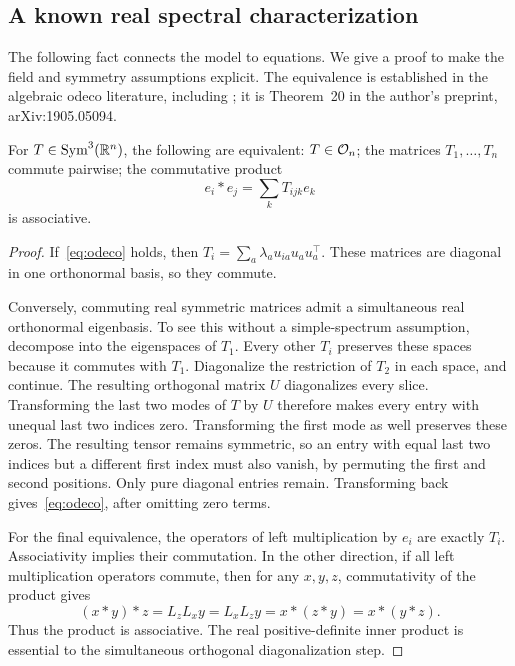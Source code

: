 \subsection{A known real spectral characterization}
The following fact connects the model to equations. We give a proof to make the field and symmetry assumptions explicit. The equivalence is established in the algebraic odeco literature, including \citet{koiran2021}; it is Theorem~20 in the author's preprint, arXiv:1905.05094.

\begin{lemma}\label{lem:commuting}
For $T\in\operatorname{Sym}^3(\mathbb R^n)$, the following are equivalent: $T\in\mathcal O_n$; the matrices $T_1,\ldots,T_n$ commute pairwise; the commutative product
\begin{equation}\label{eq:product}
 e_i*e_j=\sum_k T_{ijk}e_k
\end{equation}
is associative.
\end{lemma}
\begin{proof}
If~\eqref{eq:odeco} holds, then $T_i=\sum_a\lambda_a u_{ia}u_au_a^\top$. These matrices are diagonal in one orthonormal basis, so they commute.

Conversely, commuting real symmetric matrices admit a simultaneous real orthonormal eigenbasis. To see this without a simple-spectrum assumption, decompose into the eigenspaces of $T_1$. Every other $T_i$ preserves these spaces because it commutes with $T_1$. Diagonalize the restriction of $T_2$ in each space, and continue. The resulting orthogonal matrix $U$ diagonalizes every slice. Transforming the last two modes of $T$ by $U$ therefore makes every entry with unequal last two indices zero. Transforming the first mode as well preserves these zeros. The resulting tensor remains symmetric, so an entry with equal last two indices but a different first index must also vanish, by permuting the first and second positions. Only pure diagonal entries remain. Transforming back gives~\eqref{eq:odeco}, after omitting zero terms.

For the final equivalence, the operators of left multiplication by $e_i$ are exactly $T_i$. Associativity implies their commutation. In the other direction, if all left multiplication operators commute, then for any $x,y,z$, commutativity of the product gives
\[
 (x*y)*z=L_zL_xy=L_xL_zy=x*(z*y)=x*(y*z).
\]
Thus the product is associative. The real positive-definite inner product is essential to the simultaneous orthogonal diagonalization step.
\end{proof}

